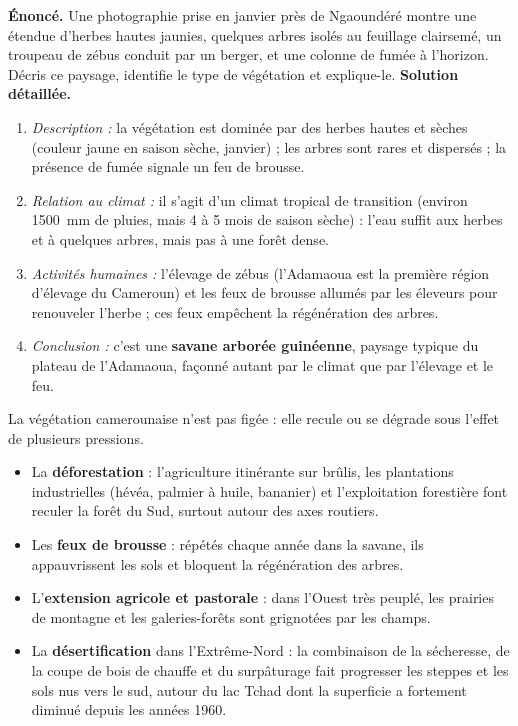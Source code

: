 \documentclass[11pt]{article}
\newcounter{popsec}
\newcounter{popsub}
\newcommand{\courssub}[1]{%
  \stepcounter{popsub}%
  \par\vspace{9pt}\noindent{\popxbold\fontsize{11.5}{13}\selectfont\color{popink}{\color{poporange}\thepopsec.\thepopsub}\hspace{6pt}#1}\par\nopagebreak\vspace{4pt}
}
\begin{document}
\begin{exoresolu}
\textbf{Énoncé.} Une photographie prise en janvier près de Ngaoundéré montre une étendue d'herbes hautes jaunies, quelques arbres isolés au feuillage clairsemé, un troupeau de zébus conduit par un berger, et une colonne de fumée à l'horizon. Décris ce paysage, identifie le type de végétation et explique-le.
\tcblower
\textbf{Solution détaillée.}
\begin{enumerate}
\item \emph{Description :} la végétation est dominée par des herbes hautes et sèches (couleur jaune en saison sèche, janvier) ; les arbres sont rares et dispersés ; la présence de fumée signale un feu de brousse.
\item \emph{Relation au climat :} il s'agit d'un climat tropical de transition (environ \SI{1500}{mm} de pluies, mais 4 à 5 mois de saison sèche) : l'eau suffit aux herbes et à quelques arbres, mais pas à une forêt dense.
\item \emph{Activités humaines :} l'élevage de zébus (l'Adamaoua est la première région d'élevage du Cameroun) et les feux de brousse allumés par les éleveurs pour renouveler l'herbe ; ces feux empêchent la régénération des arbres.
\item \emph{Conclusion :} c'est une \textbf{savane arborée guinéenne}, paysage typique du plateau de l'Adamaoua, façonné autant par le climat que par l'élevage et le feu.
\end{enumerate}
\end{exoresolu}

\courssub{Dynamiques, menaces et enjeux}

La végétation camerounaise n'est pas figée : elle recule ou se dégrade sous l'effet de plusieurs pressions.

\begin{itemize}
\item La \textbf{déforestation} : l'agriculture itinérante sur brûlis, les plantations industrielles (hévéa, palmier à huile, bananier) et l'exploitation forestière font reculer la forêt du Sud, surtout autour des axes routiers.
\item Les \textbf{feux de brousse} : répétés chaque année dans la savane, ils appauvrissent les sols et bloquent la régénération des arbres.
\item L'\textbf{extension agricole et pastorale} : dans l'Ouest très peuplé, les prairies de montagne et les galeries-forêts sont grignotées par les champs.
\item La \textbf{désertification} dans l'Extrême-Nord : la combinaison de la sécheresse, de la coupe de bois de chauffe et du surpâturage fait progresser les steppes et les sols nus vers le sud, autour du lac Tchad dont la superficie a fortement diminué depuis les années 1960.
\end{itemize}
\end{document}
